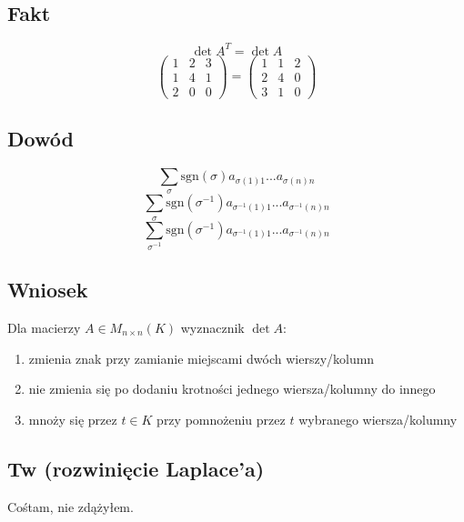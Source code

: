 \documentclass{article}
\begin{document}
  \subsection*{Fakt}
  \[\det A^T = \det A\]
  \[\begin{pmatrix}1&2&3\\1&4&1\\2&0&0\end{pmatrix}
    =\begin{pmatrix}1&1&2\\2&4&0\\3&1&0\end{pmatrix}\]

  \subsection*{Dowód}
  \[\sum_\sigma\mathrm{sgn}(\sigma)a_{\sigma(1)1}...a_{\sigma(n)n}\]
  \[\sum_\sigma\mathrm{sgn}(\sigma^{-1})a_{\sigma^{-1}(1)1}...a_{\sigma^{-1}(n)n}\]
  \[\sum_{\sigma^{-1}}\mathrm{sgn}(\sigma^{-1})a_{\sigma^{-1}(1)1}...a_{\sigma^{-1}(n)n}\]

  \subsection*{Wniosek}
  Dla macierzy $A \in M_{n \times n}(K)$ wyznacznik $\det A$:
  \begin{enumerate}
    \item zmienia znak przy zamianie miejscami dwóch wierszy/kolumn
    \item nie zmienia się po dodaniu krotności jednego wiersza/kolumny do innego
    \item mnoży się przez $t \in K$ przy pomnożeniu przez $t$ wybranego
      wiersza/kolumny
  \end{enumerate}

  \subsection*{Tw (rozwinięcie Laplace'a)}
  Cośtam, nie zdążyłem.
\end{document}
